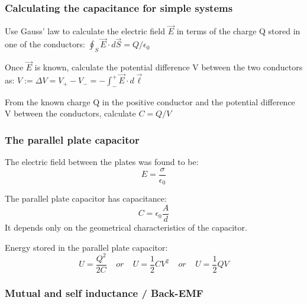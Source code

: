 \documentclass[english,11pt]{article}
\begin{document}
\subsubsection*{\bf Calculating the capacitance for simple systems}

\begin{itemize}
{\small
       \item Use Gauss' law to calculate the electric field $\vec{E}$
                 in terms of the charge Q stored in one of the conductors:
                $\oint_{S} \vec{E} \cdot d\vec{S} = Q/\epsilon_0$

       \item Once $\vec{E}$ is known, calculate the potential
                 difference V between the two conductors as:
                 $V := {\Delta}V = V_{+} - V_{-} = - \int_{-}^{+} \vec{E} \cdot d\vec{\ell}$

        \item From the known charge Q in the positive conductor and
                  the potential difference V between the conductors,
                  calculate $C = Q/V$
}
\end{itemize}

\subsubsection*{\bf The parallel plate capacitor}
\begin{itemize}
{\small
\item The electric field between the plates was found to be:
   \begin{equation*}
     E = \frac{\sigma}{\epsilon_0}
   \end{equation*}

\item The parallel plate capacitor has capacitance:
   \begin{equation*}
       C = \epsilon_0 \frac{A}{d}
   \end{equation*}
   It depends only on the geometrical characteristics of the capacitor.

\item Energy stored in the parallel plate capacitor:
   \begin{equation*}
       U = \frac{Q^2}{2C} \;\;\;\; or \;\;\;\;
       U = \frac{1}{2} C V^2 \;\;\;\; or \;\;\;\;
       U = \frac{1}{2} Q V
   \end{equation*}
}
\end{itemize}

\subsubsection*{\bf Mutual and self inductance / Back-EMF}
\end{document}

